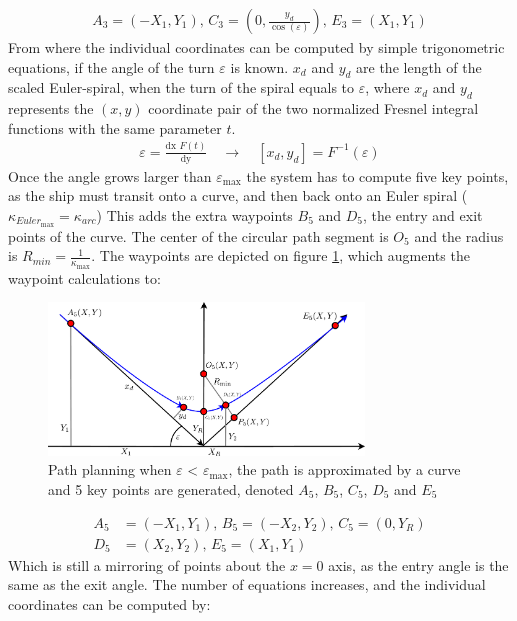 \documentclass{ifacconf}
\begin{document}
\begin{align}
A_3 = (-X_1,Y_1),\, C_3 = (0,\frac{y_d}{\cos(\varepsilon)}),\, E_3 = (X_1,Y_1)
\end{align}
From where the individual coordinates can be computed by simple trigonometric equations, if the angle of the turn $\varepsilon$ is known. $x_d$ and $y_d$ are the length of the scaled Euler-spiral, when the turn of the spiral equals to $\varepsilon$, where $x_d$ and $y_d$ represents the $(x,y)$ coordinate pair of the two normalized Fresnel integral functions with the same parameter $t$. 
\begin{align}
\varepsilon = \frac{\textrm{dx }F(t)}{\textrm{dy}} \quad \to \quad [x_d,y_d] = F^{-1}(\varepsilon)
\end{align}
Once the angle grows larger than $\varepsilon_\text{max}$ the system has to compute five key points, as the ship must transit onto a curve, and then back onto an Euler spiral ($\kappa_{Euler_\text{max}} = \kappa_{arc}$) This adds the extra waypoints $B_5$ and $D_5$, the entry and exit points of the curve. The center of the circular path segment is $O_5$ and the radius is $R_{min} = \frac{1}{\kappa_\text{max}}$. The waypoints are depicted on figure \ref{fig:5points}, which augments the waypoint calculations to:
\begin{figure}
	\begin{center}
		\includegraphics[width=8.4cm]{img/5Points}    %
		\caption{Path planning when $\varepsilon$ < $\varepsilon_\text{max}$, the path is approximated by a curve and 5 key points are generated, denoted $A_5$, $B_5$, $C_5$, $D_5$ and $E_5$}  %
		\label{fig:5points}               
	\end{center}                                 %
\end{figure}
\begin{align}
A_5 &= (-X_1,Y_1),\, B_5 = (-X_2,Y_2),\, C_5 = (0,Y_R)\\
D_5 &= (X_2,Y_2),\, E_5 = (X_1,Y_1)
\end{align}
Which is still a mirroring of points about the $x=0$ axis, as the entry angle is the same as the exit angle. The number of equations increases, and the individual coordinates can be computed by:
\end{document}
